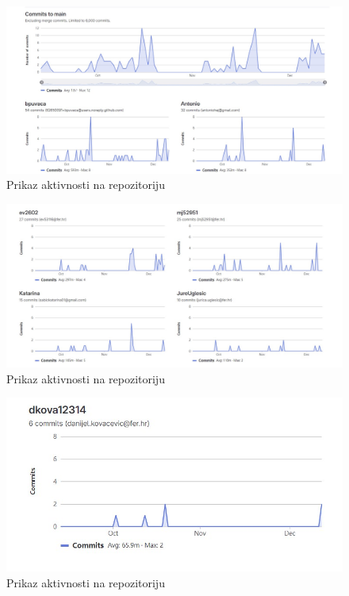             \begin{figure}[H] \includegraphics[width=\linewidth]{slike/pregledpromjena1.jpg}
				\caption{Prikaz aktivnosti na repozitoriju}
			\end{figure}

            \begin{figure}[H] \includegraphics[width=\linewidth]{slike/pregledpromjena2.jpg}
				\caption{Prikaz aktivnosti na repozitoriju}
			\end{figure}

            \begin{figure}[H] \includegraphics[width=\linewidth]{slike/pregledpromjena3.jpg}
				\caption{Prikaz aktivnosti na repozitoriju}
			\end{figure}
		
		
		
		
		
	    